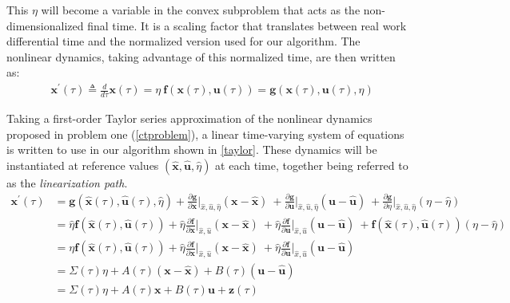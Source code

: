 \documentclass[conf]{new-aiaa}
\begin{document}
This $\eta$ will become a variable in the convex subproblem that acts as the non-dimensionalized final time. It is a scaling factor that translates between real work differential time and the normalized version used for our algorithm. The nonlinear dynamics, taking advantage of this normalized time, are then written as:
\begin{align}
& \mathbf{x}^\prime(\tau) \triangleq \frac{d}{d\tau}\mathbf{x}(\tau) = \eta \  \mathbf{f}(\mathbf{x}(\tau), \mathbf{u}(\tau)) = \mathbf{g}(\mathbf{x}(\tau), \mathbf{u}(\tau), \eta)
\end{align}

Taking a first-order Taylor series approximation of the nonlinear dynamics proposed in problem one (\ref{ctproblem}), a linear time-varying system of equations is written to use in our algorithm shown in \ref{taylor}. These dynamics will be instantiated at reference values $(\hat{\mathbf{x}}, \hat{\mathbf{u}}, \hat{\eta})$ at each time, together being referred to as the \textit{linearization path}. 
%
\begin{subequations}
\label{taylor}
\begin{align}
\mathbf{x}^\prime(\tau) 
&= \mathbf{g}(\hat{\mathbf{x}}(\tau), \hat{\mathbf{u}}(\tau), \hat{\eta})
+ \frac{\partial \mathbf{g}}{\partial \mathbf{x}} \bigg\rvert_{\hat{x},\hat{u},\hat{\eta}} (\mathbf{x} - \hat{\mathbf{x}}) \ 
+ \frac{\partial \mathbf{g}}{\partial \mathbf{u}} \bigg\rvert_{\hat{x},\hat{u},\hat{\eta}} (\mathbf{u} - \hat{\mathbf{u}}) \ 
+ \frac{\partial \mathbf{g}}{\partial \eta} \bigg\rvert_{\hat{x},\hat{u},\hat{\eta}} (\eta - \hat{\eta}) \\
&= \hat{\eta} \mathbf{f}(\hat{\mathbf{x}}(\tau), \hat{\mathbf{u}}(\tau))
+ \hat{\eta} \frac{\partial \mathbf{f}}{\partial \mathbf{x}} \bigg\rvert_{\hat{x},\hat{u}} (\mathbf{x} - \hat{\mathbf{x}}) \
+ \hat{\eta} \frac{\partial \mathbf{f}}{\partial \mathbf{u}} \bigg\rvert_{\hat{x},\hat{u}} (\mathbf{u} - \hat{\mathbf{u}}) \
+ \mathbf{f}(\hat{\mathbf{x}}(\tau), \hat{\mathbf{u}}(\tau)) (\eta - \hat{\eta}) \\
&= {\eta} \mathbf{f}(\hat{\mathbf{x}}(\tau), \hat{\mathbf{u}}(\tau))
+ \hat{\eta} \frac{\partial \mathbf{f}}{\partial \mathbf{x}} \bigg\rvert_{\hat{x},\hat{u}} (\mathbf{x} - \hat{\mathbf{x}}) \
+ \hat{\eta} \frac{\partial \mathbf{f}}{\partial \mathbf{u}} \bigg\rvert_{\hat{x},\hat{u}} (\mathbf{u} - \hat{\mathbf{u}}) \\ 
& = \Sigma(\tau)\eta + A(\tau) (\mathbf{x} - \hat{\mathbf{x}}) + B(\tau)(\mathbf{u} - \hat{\mathbf{u}})  \\ 
&= \Sigma(\tau)\eta + A(\tau)\mathbf{x} + B(\tau)\mathbf{u} + \mathbf{z}(\tau)
\end{align}
\end{subequations}
\end{document}
